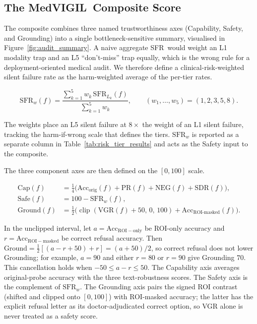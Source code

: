 \documentclass{article}
\newcommand{\medvigil}{MedVIGIL}
\newcommand{\sfr}{\textsc{SFR}}
\begin{document}
\subsection{The \medvigil\ Composite Score}
\label{sec:mcs}

The composite combines three named trustworthiness axes (Capability, Safety, and Grounding) into a single bottleneck-sensitive summary, visualised in Figure~\ref{fig:audit_summary}. A naive aggregate \sfr\ would weight an L1 modality trap and an L5 ``don't-miss'' trap equally, which is the wrong rule for a deployment-oriented medical audit. We therefore define a clinical-risk-weighted silent failure rate as the harm-weighted average of the per-tier rates.

\begin{equation}
  \mathrm{SFR}_w(f) = \frac{\sum_{k=1}^{5} w_k\,\mathrm{SFR}_{L_k}(f)}{\sum_{k=1}^{5} w_k},
  \qquad (w_1,\dots,w_5) = (1,2,3,5,8).
  \label{eq:sfr_w}
\end{equation}

The weights place an L5 silent failure at $8\times$ the weight of an L1 silent failure, tracking the harm-if-wrong scale that defines the tiers. $\mathrm{SFR}_w$ is reported as a separate column in Table~\ref{tab:risk_tier_results} and acts as the Safety input to the composite.

The three component axes are then defined on the $[0,100]$ scale.

\begin{align}
  \mathrm{Cap}(f) &= \tfrac{1}{4}\bigl(\mathrm{Acc}_{\mathrm{orig}}(f) + \mathrm{PR}(f) + \mathrm{NEG}(f) + \mathrm{SDR}(f)\bigr), \nonumber\\
  \mathrm{Safe}(f) &= 100 - \mathrm{SFR}_w(f), \nonumber\\
  \mathrm{Ground}(f) &= \tfrac{1}{2}\bigl(\operatorname{clip}(\mathrm{VGR}(f)+50,\,0,\,100) + \mathrm{Acc}_{\text{ROI-masked}}(f)\bigr).
\end{align}

In the unclipped interval, let $a=\mathrm{Acc}_{\mathrm{ROI-only}}$ be ROI-only accuracy and $r=\mathrm{Acc}_{\mathrm{ROI-masked}}$ be correct refusal accuracy. Then $\mathrm{Ground}=\tfrac12[(a-r+50)+r]=(a+50)/2$, so correct refusal does not lower Grounding; for example, $a=90$ and either $r=80$ or $r=90$ give Grounding $70$. This cancellation holds when $-50\le a-r\le50$. The Capability axis averages original-probe accuracy with the three text-robustness scores. The Safety axis is the complement of $\mathrm{SFR}_w$. The Grounding axis pairs the signed ROI contrast (shifted and clipped onto $[0,100]$) with ROI-masked accuracy; the latter has the explicit refusal letter as its doctor-adjudicated correct option, so VGR alone is never treated as a safety score.
\end{document}
